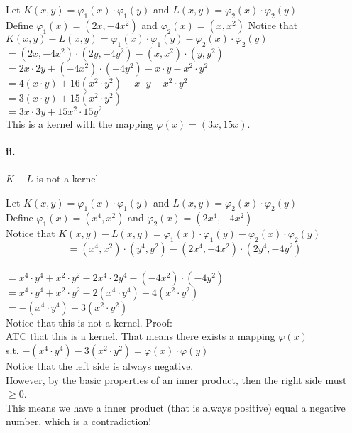\documentclass[12pt]{article}
\newcommand\tab[1][1cm]{\hspace*{#1}}
\begin{document}
Let $K(x,y) = \varphi_1(x)\cdot\varphi_1(y)$ and $L(x,y) = \varphi_2(x)\cdot\varphi_2(y)$ \\
			Define $\varphi_1(x) = (2x, -4x^2)$ and $\varphi_2(x) = (x, x^2) $
			Notice that $ K(x,y) - L(x,y) = \varphi_1(x)\cdot\varphi_1(y) - \varphi_2(x)\cdot\varphi_2(y) $ \\
			$ = (2x, -4x^2)\cdot(2y, -4y^2) - (x, x^2)\cdot(y,y^2) $ \\
			$ = 2x \cdot 2y + (-4x^2) \cdot (-4y^2) - x \cdot y - x^2 \cdot y^2 $ \\
			$ = 4(x \cdot y) + 16(x^2 \cdot y^2) - x \cdot y - x^2 \cdot y^2 $ \\
			$ = 3(x \cdot y) + 15(x^2 \cdot y^2) $ \\
			$ = 3x \cdot 3y + 15x^2 \cdot 15y^2 $ \\
			This is a kernel with the mapping $ \varphi(x) = (3x, 15x) $.

\paragraph{\tab ii.}

$K - L$ is not a kernel

Let $K(x,y) = \varphi_1(x)\cdot\varphi_1(y)$ and $L(x,y) = \varphi_2(x)\cdot\varphi_2(y)$ \\
Define $\varphi_1(x) = (x^4, x^2)$ and $\varphi_2(x) = (2x^4, -4x^2) $ \\
Notice that $ K(x,y) - L(x,y) = \varphi_1(x)\cdot\varphi_1(y) - \varphi_2(x)\cdot\varphi_2(y) $ \\
$$ = (x^4, x^2)\cdot(y^4,y^2) - (2x^4, -4x^2)\cdot(2y^4, -4y^2) $$ \\
$ = x^4 \cdot y^4 + x^2 \cdot y^2 - 2x^4 \cdot 2y^4 - (-4x^2) \cdot (-4y^2) $ \\
$ = x^4 \cdot y^4 + x^2 \cdot y^2 - 2(x^4 \cdot y^4) - 4(x^2 \cdot y^2) $ \\
$ = -(x^4 \cdot y^4) - 3(x^2 \cdot y^2) $ \\
Notice that this is not a kernel. Proof: \\
ATC that this is a kernel. That means there exists a mapping $\varphi(x)$ \\
s.t. $ -(x^4 \cdot y^4) - 3(x^2 \cdot y^2) = \varphi(x) \cdot \varphi(y) $ \\
Notice that the left side is always negative. \\
However, by the basic properties of an inner product, then the right side must  $ \geq 0 $. \\
This means we have a inner product (that is always positive) equal a negative number, which is a contradiction!
			
\end{document}
